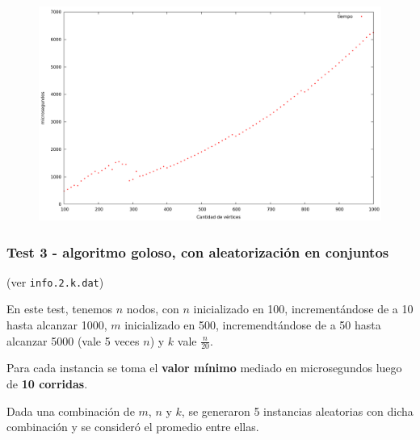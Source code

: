 \vspace*{0.5cm}

\begin{figure}[h]
  \begin{center}
    \includegraphics[scale=0.35]{imagenes/grafico-greedy-a.png}
  \end{center}
\end{figure}

\vspace{0.5cm}


\newpage
\subsubsection{Test 3 - algoritmo goloso, con aleatorización en conjuntos}

(ver \verb|info.2.k.dat|) \medskip

En este test, tenemos $n$ nodos, con $n$ inicializado en 100, incrementándose de a 10 hasta alcanzar 1000, $m$ inicializado en 500, incremendtándose de a 50 hasta alcanzar 5000 (vale 5 veces $n$) y $k$ vale $\frac{n}{20}$.

Para cada instancia se toma el \textbf{valor mínimo} mediado en microsegundos luego de \textbf{10 corridas}.

Dada una combinación de $m$, $n$ y $k$, se generaron 5 instancias aleatorias con dicha combinación y se consideró el promedio entre ellas.

\vspace*{0.5cm}

